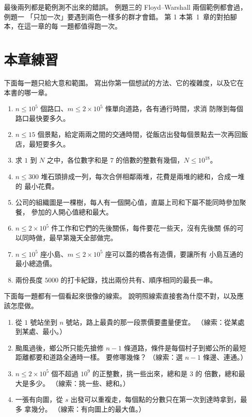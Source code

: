 最後兩列都是範例測不出來的錯誤。 例題三的 Floyd--Warshall 兩個範例都會過，例題一
「只加一次」要遇到兩色一樣多的群才會錯。 第 1 本第~1~章的對拍腳本，在這一章的每
一題都值得跑一次。

\section{本章練習}
\label{sec:cap-exercises}

\begin{drills}[label=drills:cap]
\item 下面每一題只給大意和範圍。 寫出你第一個想試的方法、它的複雜度，以及它在
本書的哪一章。
\begin{enumerate}
\item $n \le 10^5$ 個路口、$m \le 2 \times 10^5$ 條單向道路，各有通行時間，求消
防隊到每個路口最快要多久。
\item $n \le 15$ 個景點，給定兩兩之間的交通時間，從飯店出發每個景點去一次再回飯
店，最短要多久。
\item 求 $1$ 到 $N$ 之中，各位數字和是 $7$ 的倍數的整數有幾個，$N \le 10^{18}$。
\item $n \le 300$ 堆石頭排成一列，每次合併相鄰兩堆，花費是兩堆的總和，合成一堆的
最小花費。
\item 公司的組織圖是一棵樹，每人有一個開心值，直屬上司和下屬不能同時參加聚餐，
參加的人開心值總和最大。
\item $n \le 2 \times 10^5$ 件工作和它們的先後關係，每件要花一些天，沒有先後關
係的可以同時做，最早第幾天全部做完。
\item $n \le 10^5$ 座小島、$m \le 2 \times 10^5$ 座可以蓋的橋各有造價，要讓所有
小島互通的最小總造價。
\item 兩份長度 $5000$ 的打卡紀錄，找出兩份共有、順序相同的最長一串。
\end{enumerate}

\item 下面每一題都有一個看起來很像的線索。 說明照線索直接套為什麼不對，以及應
該怎麼做。
\begin{enumerate}
\item 從 $1$ 號站坐到 $n$ 號站，路上最貴的那一段票價要盡量便宜。 （線索：從某處
到某處、最小。）
\item 颱風過後，鄉公所只能先搶修 $n - 1$ 條道路，條件是每個村子到鄉公所的最短
距離都要和道路全通時一樣。 要修哪幾條？ （線索：選 $n - 1$ 條邊、連通。）
\item $n \le 2 \times 10^5$ 個不超過 $10^9$ 的正整數，挑一些出來，總和是 $3$ 的
倍數，總和最大是多少。 （線索：挑一些、總和。）
\item 一張有向圖，從 $s$ 出發可以重複走，每個點的分數只在第一次到達時拿到，最多
拿幾分。 （線索：有向圖上的最大值。）
\end{enumerate}


\end{drills}
